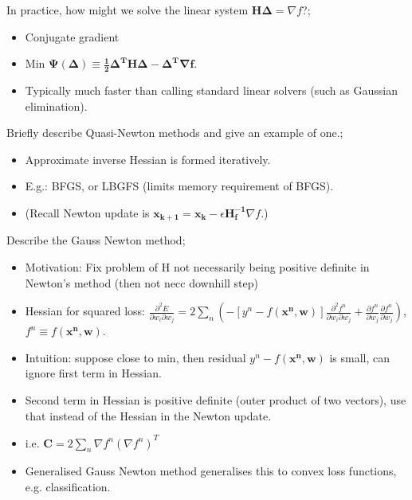 \documentclass{article}
\begin{document}
In practice, how might we solve the linear system $\mathbf{H\Delta}=\nabla f$?; \begin{itemize}
	\item Conjugate gradient
	\item Min $\mathbf{\Psi(\Delta)\equiv \frac{1}{2}\Delta^TH\Delta -\Delta^T\nabla f}$. 
	\item Typically much faster than calling standard linear solvers (such as Gaussian elimination).
\end{itemize}

Briefly describe Quasi-Newton methods and give an example of one.; \begin{itemize}
	\item Approximate inverse Hessian is formed iteratively.
	\item E.g.: BFGS, or LBGFS (limits memory requirement of BFGS).
	\item (Recall Newton update is $\mathbf{x_{k+1} = x_k} - \epsilon\mathbf{H^{-1}_f}\nabla f$.)
\end{itemize}

Describe the Gauss Newton method; \begin{itemize}
	\item Motivation: Fix problem of H not necessarily being positive definite in Newton's method (then not necc downhill step)
	\item Hessian for squared loss: $\frac{\partial^2 E}{\partial w_i \partial w_j}=2\sum_n (-[y^n-f(\mathbf{x^n, w})]\frac{\partial ^2 f^n}{\partial w_i \partial w_j}+\frac{\partial f^n}{\partial w_j}\frac{\partial f^n}{\partial w_j})$, $f^n\equiv f(\mathbf{x^n, w})$.
	\item Intuition: suppose close to min, then residual $y^n-f(\mathbf{x^n,w})$ is small, can ignore first term in Hessian. 
	\item Second term in Hessian is positive definite (outer product of two vectors), use that instead of the Hessian in the Newton update.
	\item i.e. $\mathbf{C}=2\sum_n\nabla f^n(\nabla f^n)^T$
	\item Generalised Gauss Newton method generalises this to convex loss functions, e.g. classification.
\end{itemize}
\end{document}
